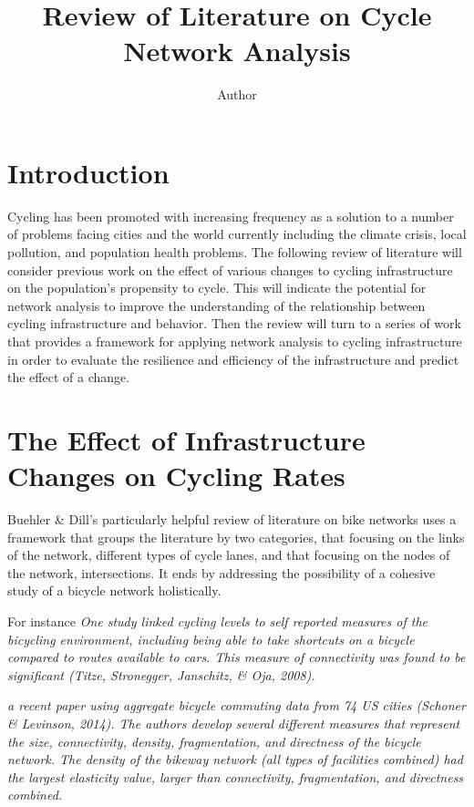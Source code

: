\documentclass[11pt]{article} %
\title{\vspace{-3.0cm}Review of Literature on Cycle Network Analysis}
\author{Author}
\begin{document}
\maketitle

\section{Introduction}

	Cycling has been promoted with increasing frequency as a solution to a number of problems facing cities and the world currently including the climate crisis, local pollution, and population health problems. The following review of literature will consider previous work on the effect of various changes to cycling infrastructure on the population's propensity to cycle. This will indicate the potential for network analysis to improve the understanding of the relationship between cycling infrastructure and behavior. Then the review will turn to a series of work that provides a framework for applying network analysis to cycling infrastructure in order to evaluate the resilience and efficiency of the infrastructure and predict the effect of a change. 
	
\section{The Effect of Infrastructure Changes on Cycling Rates}

	Buehler \& Dill's \cite{Buehler and Dill} particularly helpful review of literature on bike networks uses a framework that groups the literature by two categories, that focusing on the links of the network, different types of cycle lanes, and that focusing on the nodes of the network, intersections. It ends by addressing the possibility of a cohesive study of a bicycle network holistically. 
	
	For instance \textit{One study linked cycling levels to self reported measures of the bicycling environment, including being able to take shortcuts on a bicycle compared to routes available to cars. This measure of connectivity was found to be significant (Titze, Stronegger, Janschitz, \& Oja, 2008).}
	
	\textit{ a recent paper using aggregate bicycle commuting data from 74 US cities (Schoner \& Levinson, 2014). The authors develop several different measures that represent the size, connectivity, density, fragmentation, and directness of the bicycle network. The density of the bikeway network (all types of facilities combined) had the largest elasticity value, larger than connectivity, fragmentation, and directness combined.}
	
\end{document}

